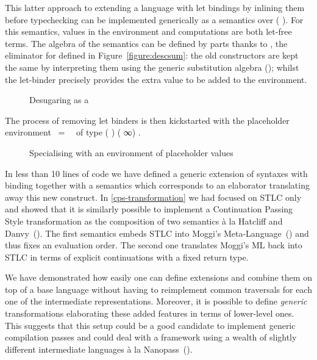 This latter approach to extending a language  with let bindings
by inlining them before typechecking can be implemented generically as
a semantics over (  ). For this semantics, values
in the environment and computations are both let-free terms. The algebra
of the semantics can be defined by parts thanks to , the eliminator
for  defined in Figure~\ref{figure:descsum}:
the old constructors are kept the same by
interpreting them using the generic substitution algebra ();
whilst the let-binder precisely provides the extra value to be added to the
environment.

\begin{figure}[h]
\caption{Desugaring as a \label{defn:UnLet}}
\end{figure}

The process of removing let binders is then kickstarted with the placeholder
environment ~=~~
of type {( ) (  ∞) }.

\begin{figure}[h]
\caption{Specialising  with an environment of placeholder values\label{defn:unlet}}
\end{figure}

In less than 10 lines of code we have defined a generic extension of
syntaxes with binding together with a semantics which corresponds
to an elaborator translating away this new construct.
In \cref{cps-transformation} we had focused on STLC only
and showed that it is similarly possible to implement a Continuation
Passing Style transformation as the composition of two semantics
à la Hatcliff and Danvy~(\citeyear{hatcliff1994generic}).
The first semantics embeds STLC into Moggi's
Meta-Language~(\citeyear{DBLP:journals/iandc/Moggi91}) and thus fixes
an evaluation order. The second one translates Moggi's ML back into
STLC in terms of explicit continuations with a fixed return type.

We have demonstrated how easily one can define extensions and combine
them on top of a base language without having to reimplement common
traversals for each one of the intermediate representations. Moreover,
it is possible to define \emph{generic} transformations elaborating
these added features in terms of lower-level ones. This suggests that
this setup could be a good candidate to implement generic compilation
passes and could deal with a framework using a wealth of slightly
different intermediate languages à la
Nanopass~(\cite{Keep:2013:NFC:2544174.2500618}).
